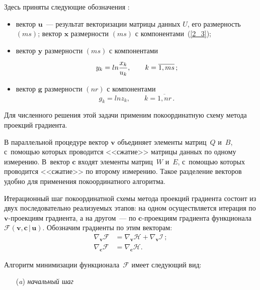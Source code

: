 \begin{multicols}{2}
Здесь приняты следующие обозначения \cite{Magnus_1988}:
\begin{itemize}
\item
вектор $\mathbf{u}$~--- результат векторизации матрицы данных $U$, его 
размерность $(ms)$; вектор $\mathbf{x}$ размерности $(ms)$ с 
компонентами~(\ref{2_3});

\item
вектор $\mathbf{y}$ размерности $(ms)$ с компонентами
\begin{equation*}
y_k = ln \displaystyle\frac{\displaystyle x_k\mathstrut}{\displaystyle u_k\mathstrut},\qquad k = \overline{1,ms}\,;
\end{equation*}

\item
вектор $\mathbf{g}$ размерности $(nr)$ с компонентами
\begin{equation*}
g_k = ln z_k,\qquad k = \overline{1,nr}\,.
\end{equation*}
\end{itemize}

Для численного решения этой задачи применим покоординатную схему метода 
проекций градиента.

В параллельной процедуре вектор $\mathbf{v}$ объединяет элементы матриц~$Q$
и~$B$, с~по\-мощью которых проводится <<сжатие>> матрицы данных по одному 
измерению. В~вектор $\mathbf{c}$ входят элементы мат\-риц~$W$ и~$E$, с~по\-мощью 
которых проводится <<сжатие>> по второму измерению. Такое разделение векторов 
удобно для применения покоординатного ал\-го\-ритма.

Итерационный шаг покоординатной схемы
метода проекций градиента состоит из двух последовательно реализуемых этапов: 
на одном осуществляется итерация по  $\mathbf{v}$-про\-ек\-ци\-ям градиента, 
а на другом~--- по 
$\mathbf{c}$-про\-ек\-ци\-ям градиента функционала $\mathcal{F}(\mathbf{v}, 
\mathbf{c}\,|\,\mathbf{u})$.
Обозначим градиенты по этим векторам:
\begin{align*}
\nabla_{\mathbf{v}} \mathcal{F} &= \nabla_{\mathbf{v}} \mathcal{H} + 
\nabla_{\mathbf{v}} \mathcal{I}\,;\\[6pt]
\nabla_{\mathbf{c}} \mathcal{F} &= \nabla_{\mathbf{c}} \mathcal{H}.
\end{align*}

Алгоритм минимизации функционала~$\mathcal{F}$ имеет следующий вид:
\begin{itemize}
\item[(\textit{a})] \textit{начальный шаг}


\end{itemize}
\end{multicols}
